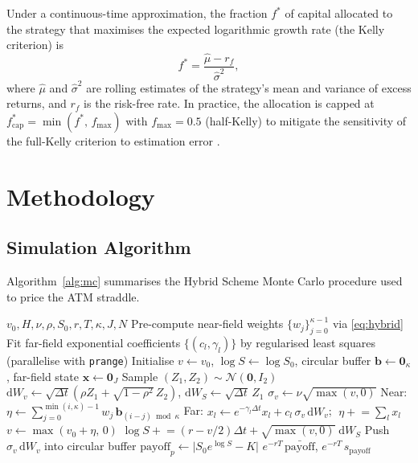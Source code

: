 \documentclass[conference]{IEEEtran}
\newcommand{\N}{\mathcal{N}}
\newcommand{\dd}{\mathrm{d}}
\newcommand{\abs}[1]{\lvert #1 \rvert}
\begin{document}
Under a continuous-time approximation, the fraction $f^*$ of capital
allocated to the strategy that maximises the expected logarithmic
growth rate (the Kelly criterion) is
\begin{equation}\label{eq:kelly}
  f^* = \frac{\hat{\mu} - r_f}{\hat{\sigma}^2},
\end{equation}
where $\hat{\mu}$ and $\hat{\sigma}^2$ are rolling estimates of the
strategy's mean and variance of excess returns, and $r_f$ is the
risk-free rate.  In practice, the allocation is capped at
$f^*_{\text{cap}} = \min(f^*,\, f_{\max})$ with $f_{\max} = 0.5$
(half-Kelly) to mitigate the sensitivity of the full-Kelly criterion
to estimation error \cite{thorp2011kelly}.

\section{Methodology}\label{sec:method}

\subsection{Simulation Algorithm}

Algorithm~\ref{alg:mc} summarises the Hybrid Scheme Monte Carlo
procedure used to price the ATM straddle.

\begin{algorithm}[h]
\caption{Hybrid Scheme Monte Carlo Straddle Pricer}\label{alg:mc}
\begin{algorithmic}[1]
  \Require $v_0, H, \nu, \rho, S_0, r, T, \kappa, J, N$
  \State Pre-compute near-field weights $\{w_j\}_{j=0}^{\kappa-1}$
         via \eqref{eq:hybrid}
  \State Fit far-field exponential coefficients $\{(c_l,\gamma_l)\}$
         by regularised least squares
   \hfill (parallelise with \texttt{prange})
    \State Initialise $v \leftarrow v_0$, $\log S \leftarrow \log S_0$,
           circular buffer $\mathbf{b} \leftarrow \mathbf{0}_\kappa$,
           far-field state $\mathbf{x} \leftarrow \mathbf{0}_J$
      \State Sample $(Z_1, Z_2) \sim \N(\mathbf{0}, I_2)$
      \State $\dd W_v \leftarrow \sqrt{\Delta t}(\rho Z_1
             + \sqrt{1-\rho^2}\,Z_2)$,
             $\dd W_S \leftarrow \sqrt{\Delta t}\,Z_1$
      \State $\sigma_v \leftarrow \nu\sqrt{\max(v,0)}$
      \State Near: $\eta \leftarrow \sum_{j=0}^{\min(i,\kappa)-1}
             w_j\,\mathbf{b}_{(i-j)\bmod\kappa}$
      \State Far: $x_l \leftarrow e^{-\gamma_l\Delta t}x_l
             + c_l\,\sigma_v\,\dd W_v$; $\;\eta \mathrel{+}=
             \sum_l x_l$
      \State $v \leftarrow \max(v_0 + \eta,\, 0)$
      \State $\log S \mathrel{+}= (r - v/2)\Delta t
             + \sqrt{\max(v,0)}\;\dd W_S$
      \State Push $\sigma_v\,\dd W_v$ into circular buffer
    \EndFor
    \State $\text{payoff}_p \leftarrow \abs{S_0 e^{\log S} - K}$
  \EndFor
  \State \Return $e^{-rT}\,\bar{\text{payoff}}$, $e^{-rT}\,s_{\text{payoff}}$
\end{algorithmic}
\end{algorithm}
\end{document}
